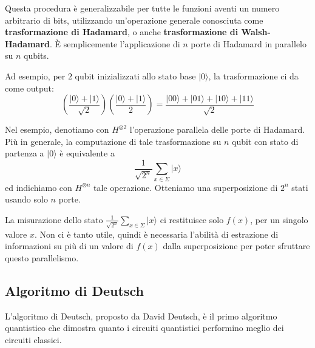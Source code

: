  Questa procedura è generalizzabile per tutte le funzioni aventi
 un numero arbitrario di bits, utilizzando un'operazione
 generale conosciuta come \textbf{trasformazione di Hadamard}, o anche
 \textbf{trasformazione di Walsh-Hadamard}. È semplicemente l'applicazione 
 di $n$ porte di Hadamard in parallelo su $n$ qubits.
 \begin{example}{}{}
    Ad esempio, per $2$ qubit inizializzati allo stato base $|0\rangle$,
    la trasformazione ci da come output:
    \begin{equation*}
        \left(\frac{|0\rangle + |1\rangle}{\sqrt{2}}\right)\left(\frac{|0\rangle + |1\rangle}{2}\right) = \frac{|00\rangle + |01\rangle +|10\rangle +|11\rangle}{\sqrt{2}}
    \end{equation*}
 \end{example}
 Nel esempio, denotiamo con $H^{\otimes 2}$ l'operazione parallela delle porte di Hadamard. Più in generale, 
 la computazione di tale trasformazione su $n$ qubit con stato di partenza a $|0\rangle$ è equivalente a
 \begin{equation*}
    \frac{1}{\sqrt{2^n}}\sum_{x \in \Sigma} |x\rangle
 \end{equation*}
ed indichiamo con $H^{\otimes n}$ tale operazione. Otteniamo una superposizione di
\textbf{$2^n$} stati usando solo \textbf{$n$} porte.

La misurazione dello stato $\frac{1}{\sqrt{2^n}}\sum_{x \in \Sigma} |x\rangle$ ci restituisce solo $f(x)$, per un singolo
valore $x$. Non ci è tanto utile, quindi è necessaria l'abilità di estrazione di informazioni
su più di un valore di $f(x)$ dalla superposizione per poter sfruttare questo parallelismo.

\subsection{Algoritmo di Deutsch}
L'algoritmo di Deutsch, proposto da David Deutsch, è il primo algoritmo quantistico che dimostra 
quanto i circuiti quantistici performino meglio dei circuiti classici.

